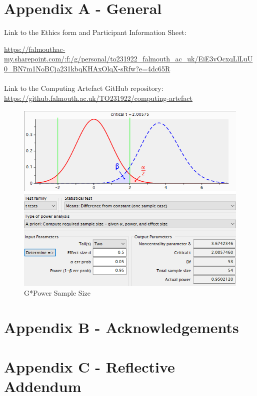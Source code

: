 \newpage
\section*{Appendix A - General} \label{append:a}
Link to the Ethics form and Participant Information Sheet:

\url{https://falmouthac-my.sharepoint.com/:f:/g/personal/to231922_falmouth_ac_uk/EiE3vOcxqLlLuU0_BN7m1NoBCja231kbqKHAxOlqX-sRfw?e=4dc65R}
\\
\\
Link to the Computing Artefact GitHub repository: 
\url{https://github.falmouth.ac.uk/TO231922/computing-artefact}
\begin{figure}[ht]
    \includegraphics[width=\columnwidth]{./Images/gpower.png}
    \centering
    \caption{G*Power Sample Size}
    \label{gpower}
\end{figure}



\section*{Appendix B - Acknowledgements} \label{append:b}

\section*{Appendix C - Reflective Addendum} \label{append:C}

\newpage
